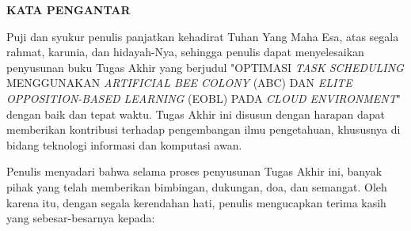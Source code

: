 \begin{center}
  \Large
  \textbf{KATA PENGANTAR}
\end{center}


\vspace{2ex}


Puji dan syukur penulis panjatkan kehadirat Tuhan Yang Maha Esa, atas segala rahmat, karunia, dan hidayah-Nya, sehingga penulis dapat menyelesaikan penyusunan buku Tugas Akhir yang berjudul "OPTIMASI \textit{TASK SCHEDULING} MENGGUNAKAN \textit{ARTIFICIAL BEE COLONY} (ABC) DAN \textit{ELITE OPPOSITION-BASED LEARNING} (EOBL) PADA \textit{CLOUD ENVIRONMENT}" dengan baik dan tepat waktu. Tugas Akhir ini disusun dengan harapan dapat memberikan kontribusi terhadap pengembangan ilmu pengetahuan, khususnya di bidang teknologi informasi dan komputasi awan.

Penulis menyadari bahwa selama proses penyusunan Tugas Akhir ini, banyak pihak yang telah memberikan bimbingan, dukungan, doa, dan semangat. Oleh karena itu, dengan segala kerendahan hati, penulis mengucapkan terima kasih yang sebesar-besarnya kepada:

